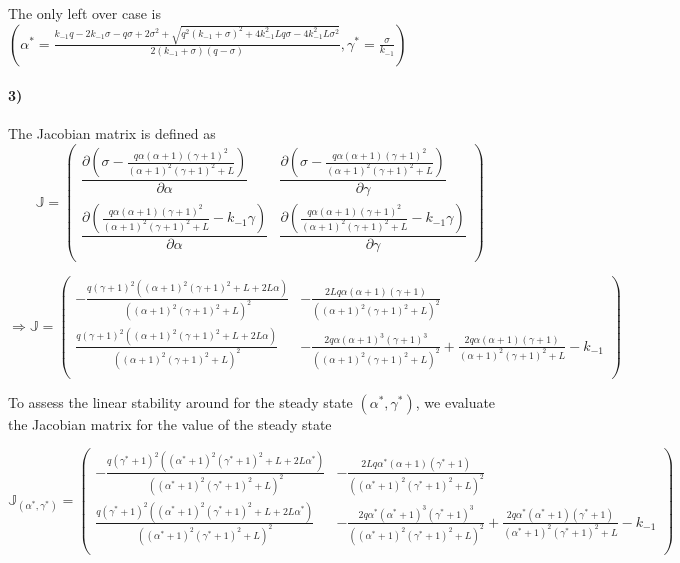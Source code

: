 \documentclass{article}
\begin{document}
The only left over case is $\left( \alpha^*=\frac{k_{-1} q-2 k_{-1} \sigma -q \sigma +2 \sigma ^2 + \sqrt{q^2 (k_{-1}+\sigma )^2+4 k_{-1}^2 L q \sigma -4 k_{-1}^2 L \sigma ^2}}{2 (k_{-1}+\sigma ) (q-\sigma )},\gamma^*=\frac{\sigma }{k_{-1}} \right) $
\paragraph{3)}
The Jacobian matrix is defined as
$$
\mathbb{J}=
\left(
\begin{array}{cc}
\dfrac{ \partial \left( \sigma-\frac{q\alpha  (\alpha +1) (\gamma +1)^2}{(\alpha +1)^2 (\gamma +1)^2+L} \right) }{\partial \alpha }  & 
\dfrac{ \partial \left( \sigma-\frac{q\alpha  (\alpha +1) (\gamma +1)^2}{(\alpha +1)^2 (\gamma +1)^2+L} \right) }{\partial \gamma }  \\
\dfrac{ \partial \left( \frac{q\alpha  (\alpha +1) (\gamma +1)^2}{(\alpha +1)^2 (\gamma +1)^2+L}-k_{-1}\gamma \right) }{\partial \alpha } & 
\dfrac{ \partial \left( \frac{q\alpha  (\alpha +1) (\gamma +1)^2}{(\alpha +1)^2 (\gamma +1)^2+L}-k_{-1}\gamma \right) }{\partial \gamma }  \\
\end{array}
\right)
$$

$$
\Rightarrow 
\mathbb{J}=
\left(
\begin{array}{cc}
 -\frac{q (\gamma +1)^2 \left((\alpha +1)^2 (\gamma +1)^2+L+2 L \alpha \right)}{\left((\alpha +1)^2 (\gamma +1)^2+L\right)^2} & -\frac{2 L q \alpha 
   (\alpha +1) (\gamma +1)}{\left((\alpha +1)^2 (\gamma +1)^2+L\right)^2} \\
 \frac{q (\gamma +1)^2 \left((\alpha +1)^2 (\gamma +1)^2+L+2 L \alpha \right)}{\left((\alpha +1)^2 (\gamma +1)^2+L\right)^2} & -\frac{2 q \alpha  (\alpha
   +1)^3 (\gamma +1)^3}{\left((\alpha +1)^2 (\gamma +1)^2+L\right)^2}+\frac{2 q \alpha  (\alpha +1) (\gamma +1)}{(\alpha +1)^2 (\gamma +1)^2+L}-k_{-1} \\
\end{array}
\right)
$$

To assess the linear stability around for the steady state $(\alpha^*,\gamma^*)$, we evaluate the Jacobian matrix for the value of the steady state  

$$
\mathbb{J}_{(\alpha^*,\gamma^*)}=
\left(
\begin{array}{cc}
 -\frac{q (\gamma^* +1)^2 \left((\alpha^* +1)^2 (\gamma^* +1)^2+L+2 L \alpha^* \right)}{\left((\alpha^* +1)^2 (\gamma^* +1)^2+L\right)^2} & -\frac{2 L q \alpha^*
   (\alpha +1) (\gamma^* +1)}{\left((\alpha^* +1)^2 (\gamma^* +1)^2+L\right)^2} \\
 \frac{q (\gamma^* +1)^2 \left((\alpha^* +1)^2 (\gamma^* +1)^2+L+2 L \alpha^* \right)}{\left((\alpha^* +1)^2 (\gamma^* +1)^2+L\right)^2} & -\frac{2 q \alpha^*  (\alpha^*
   +1)^3 (\gamma^* +1)^3}{\left((\alpha^* +1)^2 (\gamma^* +1)^2+L\right)^2}+\frac{2 q \alpha^*  (\alpha^* +1) (\gamma^* +1)}{(\alpha^* +1)^2 (\gamma^* +1)^2+L}-k_{-1} \\
\end{array}
\right)
$$
\end{document}
